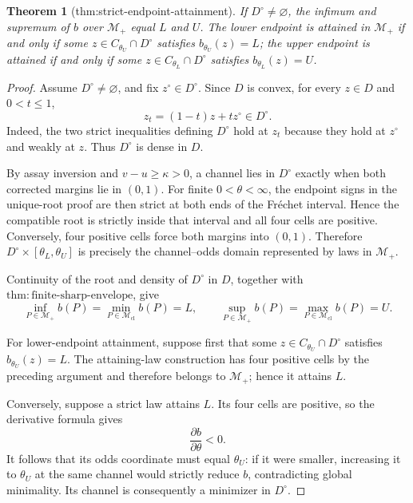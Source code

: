 \documentclass{article}
\newtheorem{theorem}{Theorem}
\begin{document}
\begin{theorem}[thm:strict-endpoint-attainment]\label{thm:strict-endpoint-attainment}
If \(D^{\circ}\neq\varnothing\), the infimum and supremum of \(b\) over \(\mathcal M_{+}\) equal \(L\) and \(U\). The lower endpoint is attained in \(\mathcal M_{+}\) if and only if some \(z\in C_{\theta_U}\cap D^{\circ}\) satisfies \(b_{\theta_U}(z)=L\); the upper endpoint is attained if and only if some \(z\in C_{\theta_L}\cap D^{\circ}\) satisfies \(b_{\theta_L}(z)=U\).
\end{theorem}
\begin{proof}
Assume \(D^\circ\neq\varnothing\), and fix \(z^\circ\in D^\circ\). Since \(D\) is convex, for every \(z\in D\) and \(0<t\leq1\),
\[
z_t=(1-t)z+t z^\circ\in D^\circ.
\]
Indeed, the two strict inequalities defining \(D^\circ\) hold at \(z_t\) because they hold at \(z^\circ\) and weakly at \(z\). Thus \(D^\circ\) is dense in \(D\).

By assay inversion and \(v-u\geq\kappa>0\), a channel lies in \(D^\circ\) exactly when both corrected margins lie in \((0,1)\). For finite \(0<\theta<\infty\), the endpoint signs in the unique-root proof are then strict at both ends of the Fr\'echet interval. Hence the compatible root is strictly inside that interval and all four cells are positive. Conversely, four positive cells force both margins into \((0,1)\). Therefore \(D^\circ\times[\theta_L,\theta_U]\) is precisely the channel--odds domain represented by laws in \(\mathcal M_+\).

Continuity of the root and density of \(D^\circ\) in \(D\), together with \(\mathrm{thm:finite\text{-}sharp\text{-}envelope}\), give
\[
\inf_{P\in\mathcal M_+}b(P)
=\min_{P\in\mathcal M_{\mathrm{cl}}}b(P)=L,
\qquad
\sup_{P\in\mathcal M_+}b(P)
=\max_{P\in\mathcal M_{\mathrm{cl}}}b(P)=U.
\]

For lower-endpoint attainment, suppose first that some \(z\in C_{\theta_U}\cap D^\circ\) satisfies \(b_{\theta_U}(z)=L\). The attaining-law construction has four positive cells by the preceding argument and therefore belongs to \(\mathcal M_+\); hence it attains \(L\).

Conversely, suppose a strict law attains \(L\). Its four cells are positive, so the derivative formula gives
\[
\frac{\partial b}{\partial\theta}<0.
\]
It follows that its odds coordinate must equal \(\theta_U\): if it were smaller, increasing it to \(\theta_U\) at the same channel would strictly reduce \(b\), contradicting global minimality. Its channel is consequently a minimizer in \(D^\circ\).


\end{proof}
\end{document}
